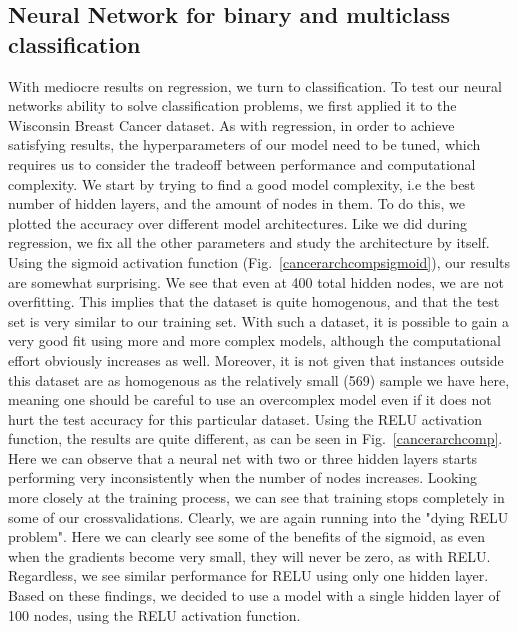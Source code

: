\documentclass[onecolumn,10pt,cleanfoot]{asme2ej}
\begin{document}
\subsection{Neural Network for binary and multiclass classification}

With mediocre results on regression, we turn to classification. To test our neural networks ability to solve classification problems, we first applied it to the Wisconsin Breast Cancer dataset. As with regression, in order to achieve satisfying results, the hyperparameters of our model need to be tuned, which requires us to consider the tradeoff between performance and computational complexity. We start by trying to find a good model complexity, i.e the best number of hidden layers, and the amount of nodes in them. To do this, we plotted the accuracy over different model architectures. Like we did during regression, we fix all the other parameters and study the architecture by itself. Using the sigmoid activation function (Fig.~\ref{cancerarchcompsigmoid}), our results are somewhat surprising. We see that even at 400 total hidden nodes, we are not overfitting. This implies that the dataset is quite homogenous, and that the test set is very similar to our training set. With such a dataset, it is possible to gain a very good fit using more and more complex models, although the computational effort obviously increases as well. Moreover, it is not given that instances outside this dataset are as homogenous as the relatively small (569) sample we have here, meaning one should be careful to use an overcomplex model even if it does not hurt the test accuracy for this particular dataset. Using the RELU activation function, the results are quite different, as can be seen in Fig.~\ref{cancerarchcomp}. Here we can observe that a neural net with two or three hidden layers starts performing very inconsistently when the number of nodes increases. Looking more closely at the training process, we can see that training stops completely in some of our crossvalidations. Clearly, we are again running into the "dying RELU problem". Here we can clearly see some of the benefits of the sigmoid, as even when the gradients become very small, they will never be zero, as with RELU. Regardless, we see similar performance for RELU using only one hidden layer. Based on these findings, we decided to use a model with a single hidden layer of 100 nodes, using the RELU activation function.
\end{document}
